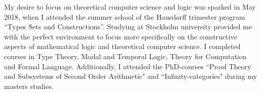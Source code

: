 \documentclass[10pt]{letter} %
\begin{document}
\begin{letter}{}


My desire to focus on theoretical computer science and logic was sparked in May 2018, when I attended the summer school of the Hausdorff trimester program ``Types Sets and Constructions''. 
Studying at Stockholm university provided me with the perfect environment to focus more specifically on the constructive aspects of mathematical logic and theoretical computer science.
I completed courses in Type Theory, Modal and Temporal Logic, Theory for Computation and Formal Language. 
Additionally, I attended the PhD-courses ``Proof Theory and Subsystems of Second Order Arithmetic" and ``Infinity-categories" during my masters studies.






\end{letter}
\end{document}
